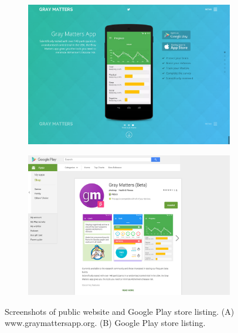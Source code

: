 \begin{figure}[h]
    \centering
    \begin{subfigure}[t]{0.48\textwidth}
        \centering
        \includegraphics[width=\textwidth]{Files/prevention-study-3/figures/graymatters-web}
        \caption{}
        \label{fig: gm-web}
    \end{subfigure}
    \hfill
    \begin{subfigure}[t]{0.48\textwidth}
        \centering
        \includegraphics[width=\textwidth]{Files/prevention-study-3/figures/graymatters-playstore}
        \caption{}
        \label{fig: gm-playstore}
    \end{subfigure}
    \caption{Screenshots of public website and Google Play store listing. (A) www.graymattersapp.org. (B) Google Play store listing.}
    \label{fig: graymatters-online}
\end{figure}


